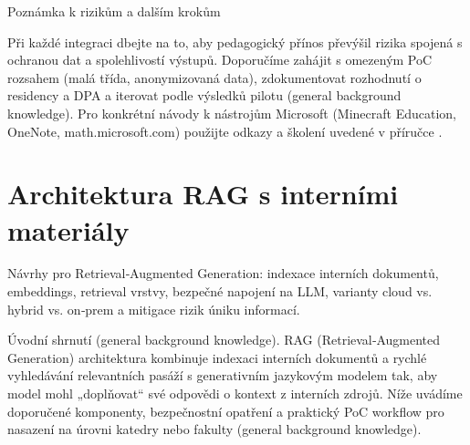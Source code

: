 \documentclass{report}%
\begin{document}
Poznámka k rizikům a dalším krokům

Při každé integraci dbejte na to, aby pedagogický přínos převýšil rizika spojená s ochranou dat a spolehlivostí výstupů. Doporučíme zahájit s omezeným PoC rozsahem (malá třída, anonymizovaná data), zdokumentovat rozhodnutí o residency a DPA a iterovat podle výsledků pilotu (general background knowledge). Pro konkrétní návody k nástrojům Microsoft (Minecraft Education, OneNote, math.microsoft.com) použijte odkazy a školení uvedené v příručce \cite{kb_ai_101_tipu_pdf_04e4a115_page_15_2, kb_ai_101_tipu_pdf_04e4a115_page_8_1, kb_ai_101_tipu_pdf_04e4a115_page_54_1}.%

%
\section{Architektura RAG s interními materiály}%
Návrhy pro Retrieval‑Augmented Generation: indexace interních dokumentů, embeddings, retrieval vrstvy, bezpečné napojení na LLM, varianty cloud vs. hybrid vs. on‑prem a mitigace rizik úniku informací.%


%

Úvodní shrnutí (general background knowledge).
RAG (Retrieval‑Augmented Generation) architektura kombinuje indexaci interních dokumentů a rychlé vyhledávání relevantních pasáží s generativním jazykovým modelem tak, aby model mohl „doplňovat“ své odpovědi o kontext z interních zdrojů. Níže uvádíme doporučené komponenty, bezpečnostní opatření a praktický PoC workflow pro nasazení na úrovni katedry nebo fakulty (general background knowledge).
\end{document}
